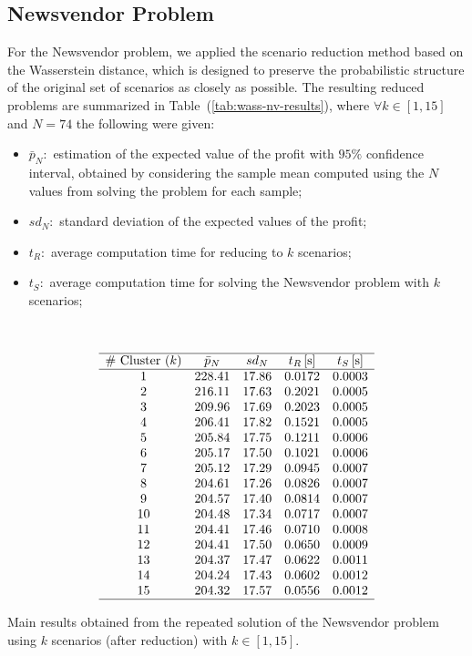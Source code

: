 \documentclass[a4paper,12pt]{article}
\begin{document}
	\subsection{Newsvendor Problem}
	
	For the Newsvendor problem, we applied the scenario reduction method based on the Wasserstein distance, which is designed to preserve the probabilistic structure of the original set of scenarios as closely as possible. The resulting reduced problems are summarized in Table~(\ref{tab:wass-nv-results}), where $\forall k \in [1,15]$ and $N = 74$ the following were given:
	\begin{itemize}
		\item $\bar{p}_{N}:$ estimation of the expected value of the profit with $95\%$ confidence interval, obtained by considering the sample mean computed using the $N$ values from solving the problem for each sample; 
		\item $sd_{N}:$ standard deviation of the expected values of the profit;
		\item $t_{R}:$ average computation time for reducing to $k$ scenarios;
		\item $t_{S}:$ average computation time for solving the Newsvendor problem with $k$ scenarios;
	\end{itemize}~
	
	\begin{table}[H]
	\[
	\begin{array}{ccccc}
		\hline
		\text{\# Cluster $(k)$} & \text{$\bar{p}_{N}$} & \text{$sd_{N}$} & \text{$t_{R}$\,[s]} & \text{$t_{S}$\,[s]} \\
		\hline
		1 & 228.41 & 17.86 & 0.0172 & 0.0003 \\
		2 & 216.11 & 17.63 & 0.2021 & 0.0005 \\
		3 & 209.96 & 17.69 & 0.2023 & 0.0005 \\
		4 & 206.41 & 17.82 & 0.1521 & 0.0005 \\
		5 & 205.84 & 17.75 & 0.1211 & 0.0006 \\
		6 & 205.17 & 17.50 & 0.1021 & 0.0006 \\
		7 & 205.12 & 17.29 & 0.0945 & 0.0007 \\
		8 & 204.61 & 17.26 & 0.0826 & 0.0007 \\
		9 & 204.57 & 17.40 & 0.0814 & 0.0007 \\
		10 & 204.48 & 17.34 & 0.0717 & 0.0007 \\
		11 & 204.41 & 17.46 & 0.0710 & 0.0008 \\
		12 & 204.41 & 17.50 & 0.0650 & 0.0009 \\
		13 & 204.37 & 17.47 & 0.0622 & 0.0011 \\
		14 & 204.24 & 17.43 & 0.0602 & 0.0012 \\
		15 & 204.32 & 17.57 & 0.0556 & 0.0012 \\
		\hline
	\end{array}
	\]
	\caption{Main results obtained from the repeated solution of the Newsvendor problem using $k$ scenarios (after reduction) with $k \in [1,15]$.}
	\label{tab:wass-nv-results}
	\end{table}
	
\end{document}
